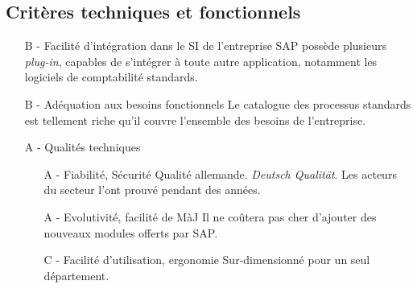 \subsection{Critères techniques et fonctionnels}

\begin{itemize}
\item[B -] Facilité d'intégration dans le SI de l'entreprise\el
	SAP possède plusieurs {\sl plug-in}, capables de s'intégrer à toute
    autre application, notamment les logiciels de comptabilité standards.
	
\item[B -] Adéquation aux besoins fonctionnels\el
	Le catalogue des processus standards est tellement riche qu'il
    couvre l'ensemble des besoins de l'entreprise.
	
\item[A -] Qualités techniques\el
    \begin{itemize}
	\item[A -] Fiabilité, Sécurité\el
		Qualité allemande. {\sl Deutsch Qualität}. Les acteurs du
        secteur l'ont prouvé pendant des années.
	
	\item[A -] Evolutivité, facilité de MàJ\el
		Il ne coûtera pas cher d'ajouter des nouveaux modules offerts par SAP. 

	\item[C -] Facilité d'utilisation, ergonomie\el
		Sur-dimensionné pour un seul département.
    \end{itemize}
\end{itemize}
